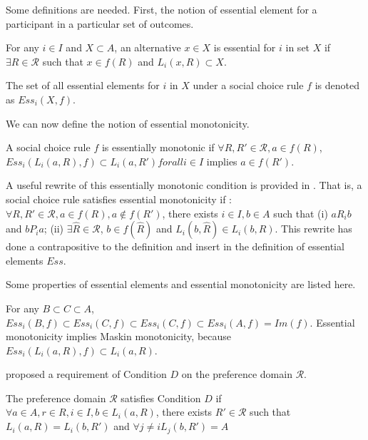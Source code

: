 Some definitions are needed. First, the notion of essential element
for a participant in a particular set of outcomes.

\begin{definition}
For any $i \in I$ and $X \subset A$, an alternative $x \in X$ is
essential for $i$ in set $X$ if $\exists R \in \mathscr{R}$ such that
$x \in f(R)$ and $ L_i(x, R) \subset X$.
\end{definition}

The set of all essential elements for $i$ in $X$ under a social choice
rule $f$ is denoted as $Ess_i(X, f)$.

We can now define the notion of essential monotonicity.

\begin{definition}
A social choice rule $f$ is essentially monotonic if $\forall R, R' \in
\mathscr{R}, a \in f(R)$,  $Ess_i(L_i(a, R), f)
\subset L_i(a, R') for all  i \in I$ implies $a \in f(R')$. 
\end{definition}

A useful rewrite of this essentially monotonic condition is provided
in \parencite{Yamato1992}. That is, a social choice rule satisfies essential
monotonicity if :  $\forall R, R' \in \mathscr{R}, a \in f(R), a \not
\in f(R')$,  there exists $i \in I, b \in A$ such that (i) $a R_i b$
and $b P_i a$; (ii) $\exists \hat{R} \in \mathscr{R}$, $b \in
f(\hat{R})$ and $L_i(b, \hat{R}) \in L_i(b, R)$.
This rewrite has done a contrapositive to the definition and
insert in the definition of essential elements $Ess$. 

\begin{remark}
Some properties of essential elements and essential monotonicity are
listed here. 

For any $ B \subset C \subset A$,  $Ess_i(B,f) \subset Ess_i(C,f)
\subset Ess_i(C,f) \subset Ess_i(A,f) = Im(f)$. Essential monotonicity
implies Maskin monotonicity, because $Ess_i(L_i(a, R), f) \subset L_i(a,R)$.
\end{remark}


\parencite{Yamato1992} proposed a requirement of Condition $D$ on the preference
domain $\mathscr{R}$.

\begin{definition}
The preference domain $\mathscr{R}$ satisfies Condition $D$ if
$\forall a \in A, r \in R, i \in I, b \in L_i(a, R)$, there exists $R'
\in \mathscr{R}$ such that $L_i(a,R) = L_i(b, R')$ and $\forall j \not
= i  L_j(b,R')=A$
\end{definition}

